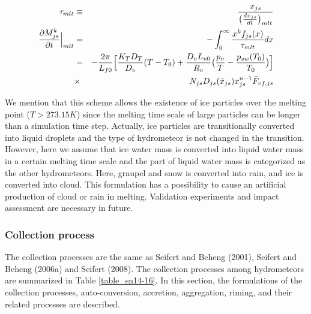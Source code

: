 \begin{eqnarray}
\tau_{mlt}&\equiv&\frac{x_{js}}{\bigl(\frac{dx_{js}}{dt}\bigr)_{mlt}}\label{sn129}\\
\frac{\partial M_{js}^{k}}{\partial t}\Bigr|_{mlt}&=&-\int_{0}^{\infty}\frac{x^{k}f_{js}(x)}{\tau_{mlt}}dx\nonumber\\
&=&-\frac{2\pi}{L_{f0}}\Bigl[\frac{K_{T}D_{T}}{D_{v}}(T-T_{0})+\frac{D_{v}L_{v0}}{R_{v}}\bigl(\frac{p_{v}}{T}-\frac{p_{sw}(T_{0})}{T_{0}}\bigr)\Bigr]\nonumber\\
&\times& N_{js}D_{js}(\bar{x}_{js})x_{js}^{n-1}\bar{F}_{vf,js}
\label{sn140}
\end{eqnarray}

We mention that this scheme allows the existence of ice particles over the melting point ($T>273.15 K$) since the melting time scale of large particles can be longer than a simulation time step. Actually, ice particles are transitionally converted into liquid droplets and the type of hydrometeor is not changed in the transition. However, here we assume that ice water mass is converted into liquid water mass in a certain melting time scale and the part of liquid water mass is categorized as the other hydrometeors. Here, graupel and snow is converted into rain, and ice is converted into cloud. This formulation has a possibility to cause an artificial production of cloud or rain in melting. Validation experiments and impact assessment are necessary in future.

\subsubsection{Collection process}
The collection processes are the same as Seifert and Beheng (2001), Seifert and Beheng (2006a) and Seifert (2008). The collection processes among hydrometeors are summarized in Table \ref{table_sn14-16}. In this section, the formulations of the collection processes, auto-conversion, accretion, aggregation, riming, and their related processes are described.


